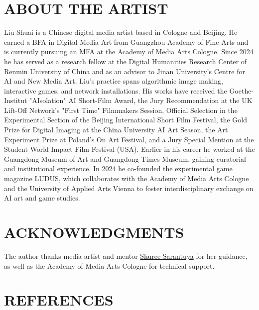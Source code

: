 \documentclass[sigconf,authordraft]{acmart}
\begin{document}
\section{ABOUT THE ARTIST}
Liu Shuai is a Chinese digital media artist based in Cologne and Beijing. He earned a BFA in Digital Media Art from Guangzhou Academy of Fine Arts and is currently pursuing an MFA at the Academy of Media Arts Cologne. Since 2024 he has served as a research fellow at the Digital Humanities Research Center of Renmin University of China and as an advisor to Jinan University's Centre for AI and New Media Art. Liu's practice spans algorithmic image making, interactive games, and network installations. His works have received the Goethe-Institut "AIsolation" AI Short-Film Award, the Jury Recommendation at the UK Lift-Off Network's "First Time" Filmmakers Session, Official Selection in the Experimental Section of the Beijing International Short Film Festival, the Gold Prize for Digital Imaging at the China University AI Art Season, the Art Experiment Prize at Poland's On Art Festival, and a Jury Special Mention at the Student World Impact Film Festival (USA). Earlier in his career he worked at the Guangdong Museum of Art and Guangdong Times Museum, gaining curatorial and institutional experience. In 2024 he co-founded the experimental game magazine LUDUS, which collaborates with the Academy of Media Arts Cologne and the University of Applied Arts Vienna to foster interdisciplinary exchange on AI art and game studies.

\section*{ACKNOWLEDGMENTS}
The author thanks media artist and mentor \href{https://shureesarantuya.com/}{Shuree Sarantuya} for her guidance, as well as the Academy of Media Arts Cologne for technical support.

\section*{REFERENCES}
\end{document}
